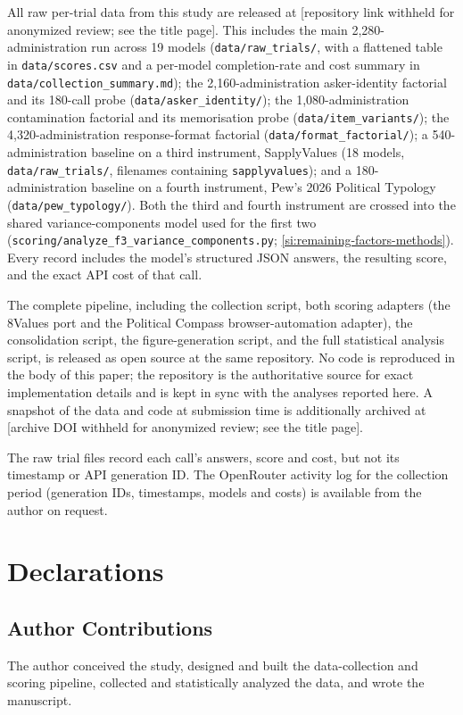 \documentclass[12pt]{article}
\begin{document}
All raw per-trial data from this study are released at
[repository link withheld for anonymized review; see the title page]. This
includes the main 2{,}280-administration
run across 19 models (\texttt{data/raw\_trials/}, with a flattened table in
\texttt{data/scores.csv} and a per-model completion-rate and cost summary in
\texttt{data/collection\_summary.md}); the 2{,}160-administration
asker-identity factorial and its 180-call probe (\texttt{data/asker\_identity/});
the 1{,}080-administration contamination factorial and its memorisation
probe (\texttt{data/item\_variants/}); the 4{,}320-administration
response-format factorial (\texttt{data/format\_factorial/}); a
540-administration baseline on a third instrument, SapplyValues (18
models, \texttt{data/raw\_trials/}, filenames containing
\texttt{sapplyvalues}); and a 180-administration baseline on a fourth
instrument, Pew's 2026 Political Typology (\texttt{data/pew\_typology/}).
Both the third and fourth instrument are crossed into the shared
variance-components model used for the first two
(\texttt{scoring/analyze\_f3\_variance\_components.py}; \ref{si:remaining-factors-methods}).
Every record includes the model's structured JSON answers, the resulting
score, and the exact API cost of that call.

The complete pipeline, including the collection script, both scoring
adapters (the 8Values port and the Political Compass browser-automation
adapter), the consolidation script, the figure-generation script, and the
full statistical analysis script, is released as open source at the same
repository. No code is reproduced in the body of this paper; the repository
is the authoritative source for exact implementation details and is kept
in sync with the analyses reported here. A snapshot of the data and code at
submission time is additionally archived at
[archive DOI withheld for anonymized review; see the title page].

The raw trial files record each call's answers, score and cost, but not its
timestamp or API generation ID. The OpenRouter activity log for the collection
period (generation IDs, timestamps, models and costs) is available from the
author on request.

\section{Declarations}
\label{si:ethics}

\subsection*{Author Contributions}
The author conceived the study, designed and built the data-collection and
scoring pipeline, collected and statistically analyzed the data, and wrote
the manuscript.
\end{document}
